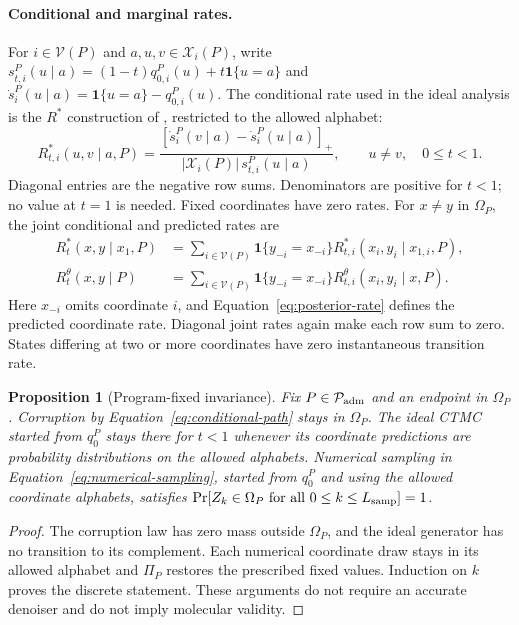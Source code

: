 \documentclass{article}
\newtheorem{proposition}[theorem]{Proposition}
\theoremstyle{definition}
\begin{document}
\paragraph{Conditional and marginal rates.}
For $i\in\mathcal V(P)$ and $a,u,v\in\mathcal X_i(P)$, write
$s_{t,i}^P(u\mid a)=(1-t)q_{0,i}^P(u)+t\mathbf1\{u=a\}$ and
$\dot s_i^P(u\mid a)=\mathbf1\{u=a\}-q_{0,i}^P(u)$.
The conditional rate used in the ideal analysis is the $R^*$ construction of
\citet{qin2025defog}, restricted to the allowed alphabet:
\begin{equation}
 R^*_{t,i}(u,v\mid a,P)
 =\frac{[\dot s_i^P(v\mid a)-\dot s_i^P(u\mid a)]_+}
 {|\mathcal X_i(P)|\,s_{t,i}^P(u\mid a)},\qquad u\neq v,\quad 0\leq t<1.
 \label{eq:ideal-conditional-rate}
\end{equation}
Diagonal entries are the negative row sums. Denominators are positive for $t<1$; no value at $t=1$
is needed. Fixed coordinates have zero rates. For $x\neq y$ in $\Omega_P$, the joint conditional
and predicted rates are
\begin{align}
 R_t^*(x,y\mid x_1,P)
 &=\sum_{i\in\mathcal V(P)}\mathbf1\{y_{-i}=x_{-i}\}
 R^*_{t,i}(x_i,y_i\mid x_{1,i},P),\\
 R_t^\theta(x,y\mid P)
 &=\sum_{i\in\mathcal V(P)}\mathbf1\{y_{-i}=x_{-i}\}
 R_{t,i}^\theta(x_i,y_i\mid x,P).
 \label{eq:joint-local-rate}
\end{align}
Here $x_{-i}$ omits coordinate $i$, and Equation~\ref{eq:posterior-rate} defines the predicted
coordinate rate. Diagonal joint rates again make each row sum to zero. States differing at two or
more coordinates have zero instantaneous transition rate.

\begin{proposition}[Program-fixed invariance]
\label{prop:fixed-invariance}
Fix $P\in\mathcal P_{\rm adm}$ and an endpoint in $\Omega_P$. Corruption by
Equation~\ref{eq:conditional-path} stays in $\Omega_P$. The ideal CTMC started from $q_0^P$ stays
there for $t<1$ whenever its coordinate predictions are probability distributions on the allowed
alphabets. Numerical sampling in Equation~\ref{eq:numerical-sampling}, started from $q_0^P$
and using the allowed coordinate alphabets, satisfies
$\Pr[Z_k\in\Omega_P\text{ for all }0\leq k\leq L_{\rm samp}]=1$.
\end{proposition}
\begin{proof}
The corruption law has zero mass outside $\Omega_P$, and the ideal generator has no transition to
its complement. Each numerical coordinate draw stays in its allowed alphabet and $\Pi_P$ restores
the prescribed fixed values. Induction on $k$ proves the discrete statement. These arguments do not
require an accurate denoiser and do not imply molecular validity.
\end{proof}
\end{document}
